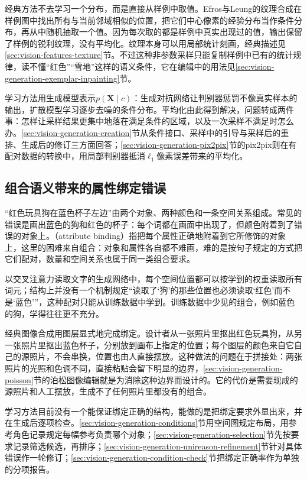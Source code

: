 经典方法不去学习一个分布，而是直接从样例中取值。Efros与Leung的纹理合成在样例图中找出所有与当前邻域相似的位置，把它们中心像素的经验分布当作条件分布，再从中随机抽取一个值。因为每次取的都是样例中真实出现过的值，输出保留了样例的锐利纹理，没有平均化。纹理本身可以用局部统计刻画，经典描述见\ref{sec:vision-features-texture}节。不过这种非参数采样只能复制样例中已有的统计规律，读不懂“红色”“雪地”这样的语义条件，它在编辑中的用法见\ref{sec:vision-generation-exemplar-inpainting}节。

学习方法用生成模型表示$p(\bm{X}\mid c)$：生成对抗网络让判别器惩罚不像真实样本的输出，扩散模型学习逐步去噪的条件分布。平均化由此得到解决，问题转成两件事：怎样让采样结果更集中地落在满足条件的区域，以及一次采样不满足时怎么办。\ref{sec:vision-generation-creation}节从条件接口、采样中的引导与采样后的重排、生成后的修订三方面回答；\ref{sec:vision-generation-pix2pix}节的pix2pix则在有配对数据的转换中，用局部判别器抵消$\ell_1$像素误差带来的平均化。

\subsection{组合语义带来的属性绑定错误}
\label{sec:vision-generation-challenge-binding}

“红色玩具狗在蓝色杯子左边”由两个对象、两种颜色和一条空间关系组成。常见的错误是画出蓝色的狗和红色的杯子：每个词都在画面中出现了，但颜色附着到了错误的对象上。（attribute binding）指把每个属性正确地附着到它所修饰的对象上，这里的困难来自组合：对象和属性各自都不难画，难的是按句子规定的方式把它们配对，数量和空间关系也属于同一类组合要求。

以交叉注意力读取文字的生成网络中，每个空间位置都可以按学到的权重读取所有词元；结构上并没有一个机制规定“读取了‘狗’的那些位置也必须读取‘红色’而不是‘蓝色’”，这种配对只能从训练数据中学到。训练数据中少见的组合，例如蓝色的狗，学得往往更不充分。

经典图像合成用图层显式地完成绑定。设计者从一张照片里抠出红色玩具狗，从另一张照片里抠出蓝色杯子，分别放到画布上指定的位置；每个图层的颜色来自它自己的源照片，不会串换，位置也由人直接摆放。这种做法的问题在于拼接处：两张照片的光照和色调不同，直接粘贴会留下明显的边界，\ref{sec:vision-generation-poisson}节的泊松图像编辑就是为消除这种边界而设计的。它的代价是需要现成的源照片和人工摆放，生成不了任何照片里都没有的组合。

学习方法目前没有一个能保证绑定正确的结构，能做的是把绑定要求外显出来，并在生成后逐项检查。\ref{sec:vision-generation-conditions}节用空间图规定布局，用参考角色记录规定每幅参考负责哪个对象；\ref{sec:vision-generation-selection}节先按要求记录筛选候选，再排序；\ref{sec:vision-generation-unireason-refinement}节针对具体错误作一轮修订；\ref{sec:vision-generation-condition-check}节把绑定正确率作为单独的分项报告。

